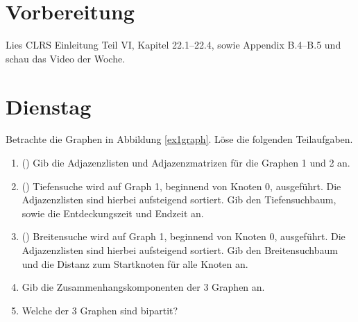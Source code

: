 \documentclass{uebung_cs}
\begin{document}
\section*{Vorbereitung}
Lies CLRS Einleitung Teil VI, Kapitel 22.1--22.4, sowie Appendix B.4--B.5 und schau das Video der Woche.

\section*{Dienstag}
\begin{aufgabe}\label{tue-first}
	Betrachte die Graphen in Abbildung \ref{ex1graph}.
	Löse die folgenden Teilaufgaben.
	\begin{enumerate}
		\item (\warmup) Gib die Adjazenzlisten und Adjazenzmatrizen für die Graphen 1 und 2 an.
		\item (\warmup) Tiefensuche wird auf Graph 1, beginnend von Knoten 0, ausgeführt.
		Die Adjazenzlisten sind hierbei aufsteigend sortiert.
		Gib den Tiefensuchbaum, sowie die Entdeckungszeit und Endzeit an.
		\item (\warmup) Breitensuche wird auf Graph 1, beginnend von Knoten 0, ausgeführt.
		Die Adjazenzlisten sind hierbei aufsteigend sortiert.
		Gib den Breitensuchbaum und die Distanz zum Startknoten für alle Knoten an.
		\item Gib die Zusammenhangskomponenten der 3 Graphen an.
		\item Welche der 3 Graphen sind bipartit?
	\end{enumerate}
\end{aufgabe}
\end{document}
